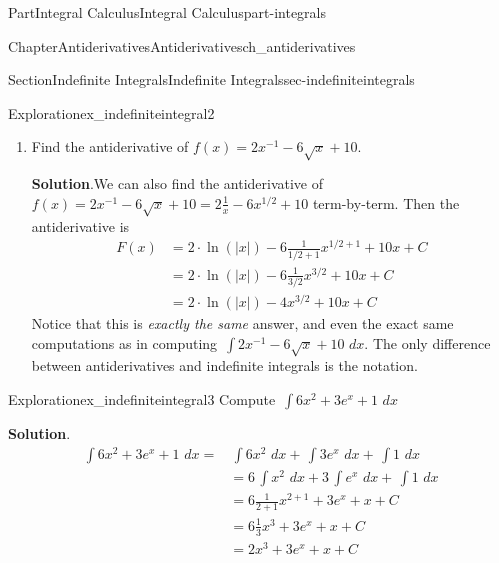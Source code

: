 \documentclass{tufte-book}
\newcommand{\blocktitlefont}{\relax}
\numberwithin{equation}{chapter}
\newcommand{\intdx}[1]{{\,\int#1\,\,dx}}
\newcommand{\amp}{&}
\begin{document}
\begin{partptx}{Part}{Integral Calculus}{}{Integral Calculus}{}{}{part-integrals}
\begin{chapterptx}{Chapter}{Antiderivatives}{}{Antiderivatives}{}{}{ch_antiderivatives}
\begin{sectionptx}{Section}{Indefinite Integrals}{}{Indefinite Integrals}{}{}{sec-indefiniteintegrals}
\begin{exploration}{Exploration}{}{ex_indefiniteintegral2}
\begin{enumerate}[font=\bfseries,label=(\alph*),ref=\alph*]
\begin{align*}
= \amp 2\intdx{\dfrac{1}{x}} - 6\intdx{x^{1/2}} + \intdx{10} \\
= \amp 2\ln(|x|) - 6\cdot \frac{1}{1/2+1} x^{1/2+1} + 10x + C\\
= \amp 2\ln(|x|) - 6\cdot \frac{1}{3/2}x^{3/2} + 10x + C\\
= \amp 2\ln(|x|) - 4 x^{3/2} + 10x + C
\end{align*}
%
\item{}Find the antiderivative of \(f(x) = 2x^{-1} - 6\sqrt{x} + 10\).%
\par\smallskip%
\noindent\textbf{\blocktitlefont Solution}.\hypertarget{ex_indefiniteintegral2-3-2}{}\quad{}We can also find the antiderivative of \(f(x) = 2x^{-1} - 6\sqrt{x} + 10 = 2\frac{1}{x} - 6x^{1/2} + 10\) term-by-term. Then the antiderivative is%
\begin{align*}
F(x) \amp = 2\cdot\ln(|x|) - 6\frac{1}{1/2+1}x^{1/2+1} + 10x + C \\
\amp = 2\cdot\ln(|x|) - 6\frac{1}{3/2}x^{3/2} + 10x + C \\
\amp = 2\cdot\ln(|x|) - 4x^{3/2} + 10x + C 
\end{align*}
Notice that this is \emph{exactly the same} answer, and even the exact same computations as in computing \(\intdx{ 2x^{-1} - 6\sqrt{x} + 10 }\). The only difference between antiderivatives and indefinite integrals is the notation.%
\end{enumerate}%
\end{exploration}%
\begin{exploration}{Exploration}{}{ex_indefiniteintegral3}%
Compute \(\intdx{ 6x^2 + 3e^x + 1} \)%
\par\smallskip%
\noindent\textbf{\blocktitlefont Solution}.\hypertarget{ex_indefiniteintegral3-2}{}\quad{}%
\begin{align*}
\intdx{ 6x^2 + 3e^x + 1} = \amp \intdx{6x^2} + \intdx{3e^x} + \intdx{1}  \\
\amp = 6\intdx{x^2} + 3\intdx{e^x} + \intdx{1}\\
\amp = 6\frac{1}{2+1}x^{2+1} + 3e^x + x + C\\
\amp = 6\frac{1}{3} x^3 + 3e^x + x + C\\
\amp = 2 x^3 + 3e^x + x + C
\end{align*}
%
\end{exploration}%
\end{sectionptx}
%
%
\typeout{************************************************}
\typeout{************************************************}

\end{chapterptx}
\end{partptx}
\end{document}
